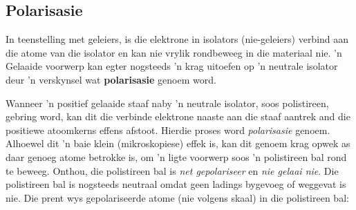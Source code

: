 

\subsection*{Polarisasie}
            \nopagebreak
In teenstelling met geleiers, is die elektrone in isolators (nie-geleiers) verbind aan die atome van die isolator en kan nie vrylik rondbeweeg in die materiaal nie. 'n Gelaaide voorwerp kan egter nogsteeds 'n krag uitoefen op 'n neutrale isolator deur 'n verskynsel wat \textbf{polarisasie} genoem word. \par

Wanneer 'n positief gelaaide staaf naby 'n neutrale isolator, soos polistireen, gebring word, kan dit die verbinde elektrone naaste aan die staaf aantrek and die positiewe atoomkerns effens afstoot. Hierdie proses word \textsl{polarisasie} genoem. Alhoewel dit 'n baie klein (mikroskopiese) effek is, kan dit genoem krag opwek as daar genoeg atome betrokke is, om 'n ligte voorwerp soos 'n polistireen bal rond te beweeg. Onthou, die polistireen bal is \textsl{net gepolariseer} en \textsl{nie gelaai nie}. Die polistireen bal is nogsteeds neutraal omdat geen ladings bygevoeg of weggevat is nie. Die prent wys gepolariseerde atome (nie volgens skaal) in die polistireen bal:\par


